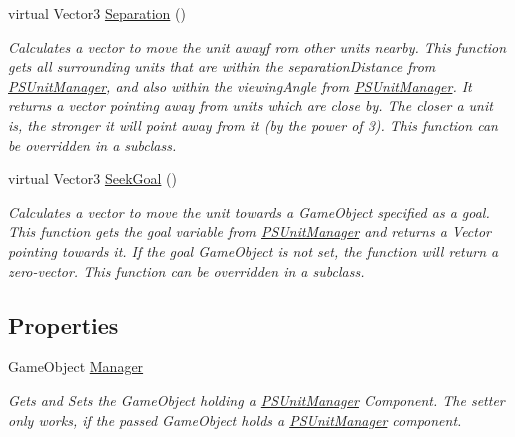 \begin{DoxyCompactItemize}
virtual Vector3 \hyperlink{class_p_s_flocking_1_1_p_s_flocking_unit_af486901d480a5520aeae135d46635e60}{Separation} ()
\begin{DoxyCompactList}\small\item\em Calculates a vector to move the unit awayf rom other units nearby. This function gets all surrounding units that are within the separation\+Distance from \hyperlink{class_p_s_flocking_1_1_p_s_unit_manager}{P\+S\+Unit\+Manager}, and also within the viewing\+Angle from \hyperlink{class_p_s_flocking_1_1_p_s_unit_manager}{P\+S\+Unit\+Manager}. It returns a vector pointing away from units which are close by. The closer a unit is, the stronger it will point away from it (by the power of 3). This function can be overridden in a subclass. \end{DoxyCompactList}\item 
virtual Vector3 \hyperlink{class_p_s_flocking_1_1_p_s_flocking_unit_ab2ce12145c79e5e179f841412ed2febb}{Seek\+Goal} ()
\begin{DoxyCompactList}\small\item\em Calculates a vector to move the unit towards a Game\+Object specified as a goal. This function gets the goal variable from \hyperlink{class_p_s_flocking_1_1_p_s_unit_manager}{P\+S\+Unit\+Manager} and returns a Vector pointing towards it. If the goal Game\+Object is not set, the function will return a zero-\/vector. This function can be overridden in a subclass. \end{DoxyCompactList}\end{DoxyCompactItemize}
\subsection*{Properties}
\begin{DoxyCompactItemize}
\item 
\mbox{\label{class_p_s_flocking_1_1_p_s_flocking_unit_ab4a20f9e1a65d566b629c59340d537dd}} 
Game\+Object \hyperlink{class_p_s_flocking_1_1_p_s_flocking_unit_ab4a20f9e1a65d566b629c59340d537dd}{Manager}
\begin{DoxyCompactList}\small\item\em Gets and Sets the Game\+Object holding a \hyperlink{class_p_s_flocking_1_1_p_s_unit_manager}{P\+S\+Unit\+Manager} Component. The setter only works, if the passed Game\+Object holds a \hyperlink{class_p_s_flocking_1_1_p_s_unit_manager}{P\+S\+Unit\+Manager} component. \end{DoxyCompactList}\end{DoxyCompactItemize}


